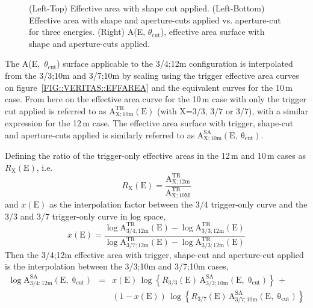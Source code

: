 \begin{figure}[t]
\begin{minipage}{\textwidth}
\hspace*{\fill}
\end{minipage}
\caption{\label{FIG::VERITAS::CUTS} (Left-Top) Effective area with shape cut 
applied. (Left-Bottom) Effective area with shape and aperture-cuts applied 
vs. aperture-cut for three energies. (Right) A(E, $\theta_\mathrm{cut}$), 
effective area surface with shape and aperture-cuts applied.}
\end{figure}

The A(E,~$\theta_\mathrm{cut}$) surface applicable to the 3/4;12m
configuration is interpolated from the 3/3;10m and 3/7;10m by scaling
using the trigger effective area curves on
figure~\ref{FIG::VERITAS::EFFAREA} and the equivalent curves for the
10\,m case. From here on the effective area curve for the 10\,m case with
only the trigger cut applied is referred to as $\mathrm{A^{TR}_{X;10m}(E)}$
(with X=3/3, 3/7 or 3/7), with a similar expression for the 12\,m
case. The effective area surface with trigger, shape-cut and
aperture-cuts applied is similarly referred to as
$\mathrm{A^{SA}_{X;10m}(E,~\theta_\mathrm{cut})}$.

Defining the ratio of the trigger-only effective areas in the 12\,m and
10\,m cases as $R\mathrm{_X(E)}$, i.e.\
\[R\mathrm{_X(E) = \frac{A^{TR}_{X;12m}}{A^{TR}_{X;10M}}}\]
and $x(\mathrm{E})$ as the interpolation factor between the 3/4 trigger-only
curve and the 3/3 and 3/7 trigger-only curve in log space,
\[x(\mathrm{E}) = \mathrm{\frac{\log A^{TR}_{3/4;12m}(E) - \log A^{TR}_{3/3;12m}(E)}
{\log A^{TR}_{3/7;12m}(E) - \log A^{TR}_{3/3;12m}(E)}}\]
Then the 3/4;12m effective area with trigger, shape-cut and
aperture-cut applied is the interpolation between the 3/3;10m and 3/7;10m
cases,
\begin{eqnarray*}
\mathrm{\log A^{SA}_{3/4;12m}(E,\;\theta_{cut})} & = &
x(\mathrm{E})\,\log \left\{R_{3/3}(\mathrm{E})\,\mathrm{A^{SA}_{3/3;10m}(E,\;\theta_{cut})}\right\}\,+\\
& & (1-x(\mathrm{E}))\,\log \left\{R_{3/7}(\mathrm{E})\,\mathrm{A^{SA}_{3/7;10m}(E,\;\theta_{cut})}\right\}
\end{eqnarray*}


